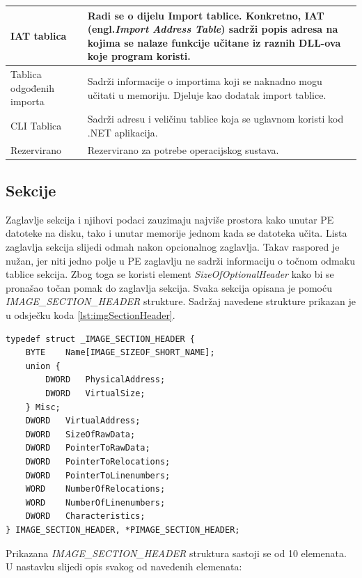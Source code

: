 \documentclass[times, utf8, diplomski, numeric]{fer}
\begin{document}
{\begin{longtable}{|l|p{6cm}|}
IAT tablica & Radi se o dijelu Import tablice. Konkretno, IAT (engl.\emph{Import Address Table}) sadrži popis adresa na kojima se nalaze funkcije učitane iz raznih DLL-ova koje program koristi. \\ \hline
Tablica odgođenih importa & Sadrži informacije o importima koji se naknadno mogu učitati u memoriju. Djeluje kao dodatak import tablice. \\ \hline
CLI Tablica & Sadrži adresu i veličinu tablice koja se uglavnom koristi kod .NET aplikacija. \\ \hline
Rezervirano & Rezervirano za potrebe operacijskog sustava. \\
\hline
\end{longtable}
}
\pagebreak



\subsection{Sekcije}
\label{sec:sekcije}
Zaglavlje sekcija i njihovi podaci zauzimaju najviše prostora kako unutar PE datoteke na disku, tako i unutar memorije jednom kada se datoteka učita. Lista zaglavlja sekcija slijedi odmah nakon opcionalnog zaglavlja. Takav raspored je nužan, jer niti jedno polje u PE zaglavlju ne sadrži informaciju o točnom odmaku tablice sekcija. Zbog toga se koristi element \emph{SizeOfOptionalHeader} kako bi se pronašao točan pomak do zaglavlja sekcija. Svaka sekcija opisana je pomoću \emph{IMAGE\_SECTION\_HEADER} strukture. Sadržaj navedene strukture prikazan je u odsječku koda \ref{lst:imgSectionHeader}.
\begin{lstlisting}[frame=single, caption=IMAGE\_SECTION\_HEADER struktura, label={lst:imgSectionHeader}]
typedef struct _IMAGE_SECTION_HEADER {
	BYTE    Name[IMAGE_SIZEOF_SHORT_NAME];
	union {
		DWORD   PhysicalAddress;
		DWORD   VirtualSize;
	} Misc;
	DWORD   VirtualAddress;
	DWORD   SizeOfRawData;
	DWORD   PointerToRawData;
	DWORD   PointerToRelocations;
	DWORD   PointerToLinenumbers;
	WORD    NumberOfRelocations;
	WORD    NumberOfLinenumbers;
	DWORD   Characteristics;
} IMAGE_SECTION_HEADER, *PIMAGE_SECTION_HEADER;
\end{lstlisting}
Prikazana \emph{IMAGE\_SECTION\_HEADER} struktura sastoji se od 10 elemenata. U nastavku slijedi opis svakog od navedenih elemenata:
\end{document}
